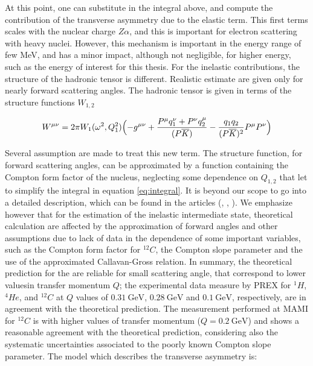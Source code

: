 At this point, one can substitute in the integral above, and compute the contribution of the transverse asymmetry due to the elastic term. This first terms scales with the nuclear charge $Z\alpha$, and this is important for electron scattering with heavy nuclei. However, this mechanism is important in the energy range of few MeV, and has a minor impact, although not negligible, for higher energy, such as the energy of interest for this thesis.
For the inelastic contributions, the structure of the hadronic tensor is different. Realistic estimate are given only for nearly forward scattering angles. The hadronic tensor is given in terms of the structure functions $W_{1,2}$

\begin{equation}
W^{\mu \nu} = 2 \pi W_{1}(\omega^{2},Q_{1}^{2}) \Bigl( -g^{\mu \nu} + \dfrac{P^{\mu}q_{1}^{\nu} +  P^{\nu}q_{2}^{\mu}}{(P \overline{K})} - \dfrac{q_{1} q_{2}}{(P \overline{K})^{2}}P^{\mu}P^{\nu} \Bigl)
\end{equation}

Several assumption are made to treat this new term. The structure function, for forward scattering angles, can be approximated by a function containing the Compton form factor of the nucleus, neglecting some dependence on $Q_{1,2}$ that let to simplify the integral in equation \ref{eq:integral}. It is beyond our scope to go into a detailed description, which can be found in the articles (\cite{Gorchtein_2006}, \cite{Gorchtein_2008}, \cite{Koshchii_2021}). We emphasize however that for the estimation of the inelastic intermediate state, theoretical calculation are affected by the approximation of forward angles and other assumptions due to lack of data in the dependence of some important variables, such as the Compton form factor for $^{12}C$, the Compton slope parameter and the use of the approximated Callavan-Gross relation. In summary, the theoretical prediction for the \transv are reliable for small scattering angle, that correspond to lower values ​​in transfer momentum $Q$; the experimental data measure by PREX \cite{HAPPEX:2012fud} for $^{1}H$, $^{4}He$, and $^{12}C$ at $Q$ values of $\SI{0.31}{\giga \electronvolt}$, $\SI{0.28}{\giga \electronvolt}$ and $\SI{0.1}{\giga \electronvolt}$, respectively, are in agreement with the theoretical prediction. The measurement performed at MAMI for $^{12}C$ \cite{Esser:2018vdp} is with higher values of transfer momentum ($Q = \SI{0.2}{\giga \electronvolt}$) and shows a reasonable agreement with the theoretical prediction, considering also the systematic uncertainties associated to the poorly known Compton slope parameter. The model which describes the transverse asymmetry is:

